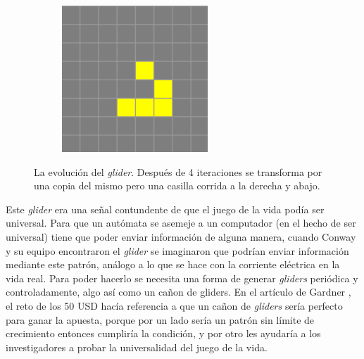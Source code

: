 \begin{figure}[b]
\begin{subfigure}{0.15\textwidth}
    \end{subfigure}
    \begin{subfigure}{0.15\textwidth}
        \includegraphics[width=\textwidth]{images/life-glider-5.png}
    \end{subfigure}
    \caption{La evoluci\'on del \textit{glider}. Despu\'es de 4 iteraciones se transforma por una copia del mismo pero una casilla corrida a la derecha y abajo.}
\end{figure}

Este \textit{glider} era una se\~nal contundente de que el juego de la vida pod\'ia ser universal. Para que un aut\'omata se asemeje a un computador (en el hecho de ser universal) tiene que poder enviar informaci\'on de alguna manera, cuando Conway y su equipo encontraron el \textit{glider} se imaginaron que podr\'ian enviar informaci\'on mediante este patr\'on, an\'alogo a lo que se hace con la corriente el\'ectrica en la vida real. Para poder hacerlo se necesita una forma de generar \textit{gliders} peri\'odica y controladamente, algo as\'i como un ca\~non de gliders. En el art\'iculo de Gardner \cite{Gardner1970}, el reto de los 50 USD hac\'ia referencia a que un ca\~non de \textit{gliders} ser\'ia perfecto para ganar la apuesta, porque por un lado ser\'ia un patr\'on sin l\'imite de crecimiento entonces cumplir\'ia la condici\'on, y por otro les ayudar\'ia a los investigadores a probar la universalidad del juego de la vida.

